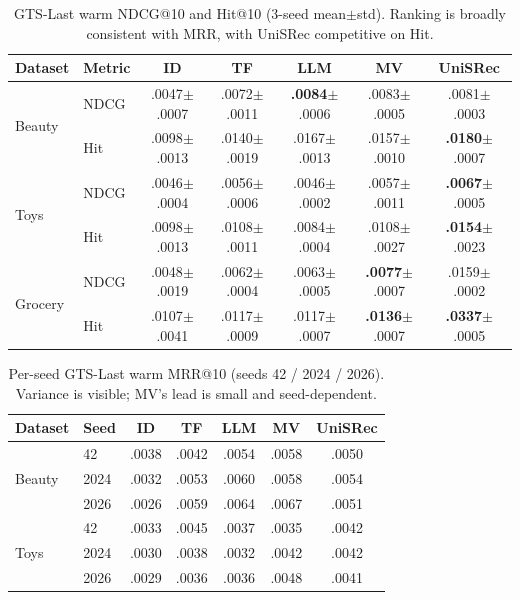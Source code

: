 \documentclass[sigconf,natbib=true,anonymous]{acmart}
\begin{document}
\begin{table}[t]
\centering
\caption{%
GTS-Last warm NDCG@10 and Hit@10 (3-seed mean$\pm$std).
Ranking is broadly consistent with MRR, with UniSRec competitive on Hit.%
}
\label{tab:ndcg_hit}
\small
\setlength{\tabcolsep}{3pt}
\begin{tabular}{@{}llccccc@{}}
\toprule
Dataset & Metric & ID & TF & LLM & MV & UniSRec \\
\midrule
\multirow{2}{*}{Beauty}
 & NDCG & .0047\tiny{$\pm$.0007} & .0072\tiny{$\pm$.0011} & \textbf{.0084}\tiny{$\pm$.0006} & .0083\tiny{$\pm$.0005} & .0081\tiny{$\pm$.0003} \\
 & Hit  & .0098\tiny{$\pm$.0013} & .0140\tiny{$\pm$.0019} & .0167\tiny{$\pm$.0013} & .0157\tiny{$\pm$.0010} & \textbf{.0180}\tiny{$\pm$.0007} \\
\midrule
\multirow{2}{*}{Toys}
 & NDCG & .0046\tiny{$\pm$.0004} & .0056\tiny{$\pm$.0006} & .0046\tiny{$\pm$.0002} & .0057\tiny{$\pm$.0011} & \textbf{.0067}\tiny{$\pm$.0005} \\
 & Hit  & .0098\tiny{$\pm$.0013} & .0108\tiny{$\pm$.0011} & .0084\tiny{$\pm$.0004} & .0108\tiny{$\pm$.0027} & \textbf{.0154}\tiny{$\pm$.0023} \\
\midrule
\multirow{2}{*}{Grocery}
 & NDCG & .0048\tiny{$\pm$.0019} & .0062\tiny{$\pm$.0004} & .0063\tiny{$\pm$.0005} & \textbf{.0077}\tiny{$\pm$.0007} & .0159\tiny{$\pm$.0002} \\
 & Hit  & .0107\tiny{$\pm$.0041} & .0117\tiny{$\pm$.0009} & .0117\tiny{$\pm$.0007} & \textbf{.0136}\tiny{$\pm$.0007} & \textbf{.0337}\tiny{$\pm$.0005} \\
\bottomrule
\end{tabular}
\end{table}

\begin{table}[t]
\centering
\caption{%
Per-seed GTS-Last warm MRR@10 (seeds 42 / 2024 / 2026).
Variance is visible; MV's lead is small and seed-dependent.%
}
\label{tab:perseed}
\small
\setlength{\tabcolsep}{3.5pt}
\begin{tabular}{@{}llccccc@{}}
\toprule
Dataset & Seed & ID & TF & LLM & MV & UniSRec \\
\midrule
\multirow{3}{*}{Beauty}
 & 42    & .0038 & .0042 & .0054 & .0058 & .0050 \\
 & 2024  & .0032 & .0053 & .0060 & .0058 & .0054 \\
 & 2026  & .0026 & .0059 & .0064 & .0067 & .0051 \\
\midrule
\multirow{3}{*}{Toys}
 & 42    & .0033 & .0045 & .0037 & .0035 & .0042 \\
 & 2024  & .0030 & .0038 & .0032 & .0042 & .0042 \\
 & 2026  & .0029 & .0036 & .0036 & .0048 & .0041 \\
\bottomrule
\end{tabular}
\end{table}
\end{document}
